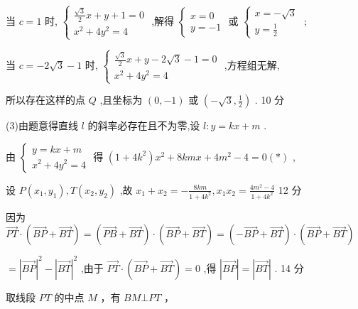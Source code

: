 \documentclass[10pt]{article}
\begin{document}
当 \(c = 1\) 时, \(\left\{  \begin{array}{l} \frac{\sqrt{3}}{2}x + y + 1 = 0 \\  {x}^{2} + 4{y}^{2} = 4 \end{array}\right.\) ,解得 \(\left\{  \begin{array}{l} x = 0 \\  y =  - 1 \end{array}\right.\) 或 \(\left\{  \begin{array}{l} x =  - \sqrt{3} \\  y = \frac{1}{2} \end{array}\right.\) ;

当 \(c =  - 2\sqrt{3} - 1\) 时, \(\left\{  \begin{array}{l} \frac{\sqrt{3}}{2}x + y - 2\sqrt{3} - 1 = 0 \\  {x}^{2} + 4{y}^{2} = 4 \end{array}\right.\) ,方程组无解,

所以存在这样的点 \(Q\) ,且坐标为 \(\left( {0, - 1}\right)\) 或 \(\left( {-\sqrt{3},\frac{1}{2}}\right)\) . 10 分

(3)由题意得直线 \(l\) 的斜率必存在且不为零,设 \(l : y = {kx} + m\) .

由 \(\left\{  \begin{array}{l} y = {kx} + m \\  {x}^{2} + 4{y}^{2} = 4 \end{array}\right.\) 得 \(\left( {1 + 4{k}^{2}}\right) {x}^{2} + {8kmx} + 4{m}^{2} - 4 = 0\left( *\right)\) ,

设 \(P\left( {{x}_{1},{y}_{1}}\right) ,T\left( {{x}_{2},{y}_{2}}\right)\) ,故 \({x}_{1} + {x}_{2} =  - \frac{8km}{1 + 4{k}^{2}},{x}_{1}{x}_{2} = \frac{4{m}^{2} - 4}{1 + 4{k}^{2}}\) 12 分

因为 \(\overrightarrow{PT} \cdot  \left( {\overrightarrow{BP} + \overrightarrow{BT}}\right)  = \left( {\overrightarrow{PB} + \overrightarrow{BT}}\right)  \cdot  \left( {\overrightarrow{BP} + \overrightarrow{BT}}\right)  = \left( {-\overrightarrow{BP} + \overrightarrow{BT}}\right)  \cdot  \left( {\overrightarrow{BP} + \overrightarrow{BT}}\right)\)

\(= {\left| \overrightarrow{BP}\right| }^{2} - {\left| \overrightarrow{BT}\right| }^{2}\) ,由于 \(\overrightarrow{PT} \cdot  \left( {\overrightarrow{BP} + \overrightarrow{BT}}\right)  = 0\) ,得 \(\left| \overrightarrow{BP}\right|  = \left| \overrightarrow{BT}\right|\) . 14 分

取线段 \({PT}\) 的中点 \(M\) ，有 \({BM} \bot  {PT}\) ，
\end{document}
